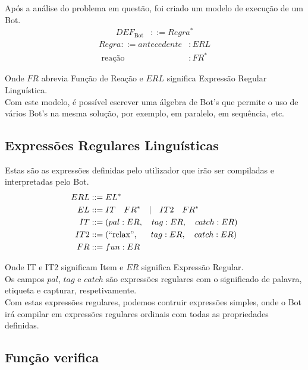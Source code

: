 \documentclass[11pt]{article} %
\begin{document}
\hspace{11pt} Após a análise do problema em questão, foi criado um modelo de execução de um Bot.\\


\begin{align*}
DEF_{\text{Bot}} &::= Regra^* 
\end{align*}
\begin{align*}
Regra ::= antecedente & : ERL \\
\text{ reação} & : FR^* 
\end{align*}


Onde $FR$ abrevia Função de Reação e $ERL$ significa Expressão Regular Linguística. \\

Com este modelo, é possível escrever uma álgebra de Bot's que permite o uso de vários Bot's na mesma solução, por exemplo, em paralelo, em sequência, etc.

\subsection{Expressões Regulares Linguísticas}
\hspace{11pt} Estas são as expressões definidas pelo utilizador que irão ser compiladas e interpretadas pelo Bot. \\

\begin{align*}
ERL &  ::=  EL^*   \\
EL & ::= IT \quad FR^* \quad | \quad  IT2 \quad  FR^*\\
IT  &::= ( pal : ER, \quad tag : ER, \quad catch : ER ) \\
IT2 &::= (\text{``relax'', \hspace{4pt}} \quad tag : ER, \quad catch : ER) \\
FR &::= fun : ER
\end{align*}

Onde IT e IT2 significam Item e $ER$ significa Expressão Regular.\\
Os campos $pal$, $tag$ e $catch$ são expressões regulares com o significado de palavra, etiqueta e capturar, respetivamente.\\

Com estas expressões regulares, podemos contruir expressões simples, onde o Bot irá compilar em expressões regulares ordinais com todas as propriedades definidas.

\subsection{Função verifica}
\end{document}
